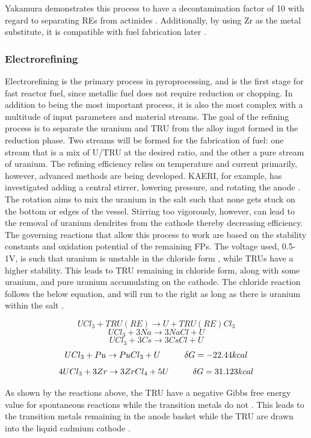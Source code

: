 Yakamura demonstrates this process to have a decontamination factor of 10 with regard to separating REs from actinides \cite{sakamura}. Additionally, by using Zr as the metal substitute, it is compatible with fuel fabrication later \cite{ohta}.
\subsubsection{Electrorefining}
Electrorefining is the primary process in pyroprocessing, and is the first stage for fast reactor fuel, since metallic fuel does not require reduction or chopping.
In addition to being the most important process, it is also the most complex with a multitude of input parameters and material streams. 
The goal of the refining process is to separate the uranium and TRU from the alloy ingot formed in the reduction phase.
Two streams will be formed for the fabrication of fuel: one stream that is a mix of U/TRU at the desired ratio, and the other a pure stream of uranium.
The refining efficiency relies on temperature and current primarily, however, advanced methods are being developed.
KAERI, for example, has investigated adding a central stirrer, lowering pressure, and rotating the anode \cite{lee_advanced}.
The rotation aims to mix the uranium in the salt such that none gets stuck on the bottom or edges of the vessel. 
Stirring too vigorously, however, can lead to the removal of uranium dendrites from the cathode thereby decreasing efficiency.\\

The governing reactions that allow this process to work are based on the stability constants and oxidation potential of the remaining FPs.
The voltage used,  0.5-1V, is such that uranium is unstable in the chloride form \cite{organisation}, while TRUs have a higher stability. 
This leads to TRU remaining in chloride form, along with some uranium, and pure uranium accumulating on the cathode.
The chloride reaction follows the below equation, and will run to the right as long as there is uranium within the salt \cite{organisation}.

\[ UCl_3+TRU(RE) \rightarrow U + TRU(RE)Cl_3 \]
\[ UCl_3 + 3Na \rightarrow 3NaCl + U \]
\[ UCl_3 + 3Cs \rightarrow 3CsCl + U \]
\[ UCl_3 + Pu \rightarrow PuCl_3 + U \hspace{10mm} \delta G = -22.44kcal \]
\[ 4UCl_3 + 3Zr \rightarrow 3ZrCl_4 + 5U \hspace{10mm} \delta G = 31.123kcal \]

As shown by the reactions above, the TRU have a negative Gibbs free energy value for spontaneous reactions while the transition metals do not \cite{supy}.
This leads to the transition metals remaining in the anode basket while the TRU are drawn into the liquid cadmium cathode \cite{lee_korean_2011}.



